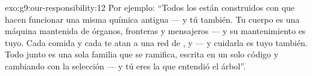 \begin{solution}{exo:g9:our-responsibility:12}
Por ejemplo: ``Todos los  están construidos con  que
hacen funcionar una misma química antigua --- y tú también. Tu cuerpo
es una máquina mantenida de órganos, fronteras y mensajeros --- y su
mantenimiento es tuyo. Cada comida y cada  te atan a una red
de ,  y  --- y cuidarla es tuyo
también. Todo junto es una sola familia que se ramifica, escrita en un
solo código y cambiando con la selección --- y tú eres la  que
entendió el árbol''.
\end{solution}


